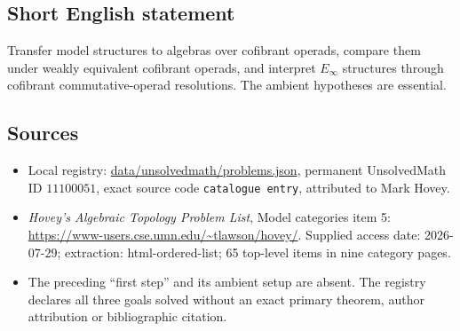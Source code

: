 \documentclass[11pt]{article}
\begin{document}
\subsection{Short English statement}
Transfer model structures to algebras over cofibrant operads, compare them under weakly equivalent cofibrant operads, and interpret $E_\infty$ structures through cofibrant commutative-operad resolutions. The ambient hypotheses are essential.
\subsection{Sources}
\begin{itemize}
\item Local registry: \url{data/unsolvedmath/problems.json}, permanent UnsolvedMath ID $11100051$, exact source code \texttt{catalogue entry}, attributed to Mark Hovey.
\item \emph{Hovey's Algebraic Topology Problem List}, Model categories item 5: \url{https://www-users.cse.umn.edu/~tlawson/hovey/}. Supplied access date: 2026-07-29; extraction: html-ordered-list; 65 top-level items in nine category pages.
\item The preceding ``first step'' and its ambient setup are absent. The registry declares all three goals solved without an exact primary theorem, author attribution or bibliographic citation.
\end{itemize}
\end{document}
